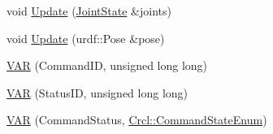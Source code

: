\begin{DoxyCompactItemize}
\item 
void \hyperlink{structCrcl_1_1CrclStatus_a626f981943a5d9a358b3394997dd8530}{Update} (\hyperlink{RCS_8h_aa4adb93a26caa4dacba9c9614e283245}{Joint\-State} \&joints)
\item 
void \hyperlink{structCrcl_1_1CrclStatus_abed6fce26b69adcec0beea0bd1d19169}{Update} (urdf\-::\-Pose \&pose)
\item 
\hyperlink{structCrcl_1_1CrclStatus_a4051bdc6200a904e5c892968e42a43d6}{V\-A\-R} (Command\-I\-D, unsigned long long)
\item 
\hyperlink{structCrcl_1_1CrclStatus_a04deac202f412e0087fd07f09ccec5b7}{V\-A\-R} (Status\-I\-D, unsigned long long)
\item 
\hyperlink{structCrcl_1_1CrclStatus_a29a7ab97f492696b8a83be8762b0afda}{V\-A\-R} (Command\-Status, \hyperlink{namespaceCrcl_a5b3aa14f2f4ed63cc67ecba8eaab5c93}{Crcl\-::\-Command\-State\-Enum})
\end{DoxyCompactItemize}
